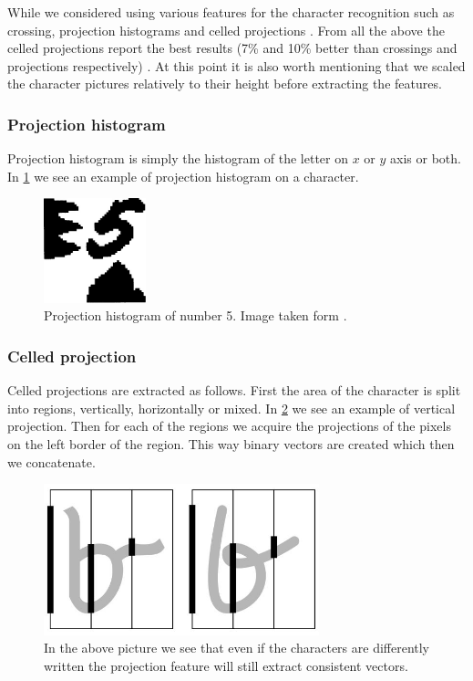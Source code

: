 While we considered using various features for the character recognition such as crossing, projection histograms and celled projections \cite{HWR:features1}\cite{HWR:features2}. From all the above the celled projections report the best results (7\% and 10\% better than crossings and projections respectively) \cite{HWR:features1}. At this point it is also worth mentioning that we scaled the character pictures relatively to their height before extracting the features.


\subsubsection{Projection histogram}
Projection histogram \cite{Chacko2015} is simply the histogram of the letter on $x$ or $y$ axis or both. In \cref{fig:method:features:hist_proj} we see an example of projection histogram on a character.

\begin{figure}[ht]
	\centering
	\includegraphics[width=8em]{shared/img/hist_project.png}
	\caption{Projection histogram of number 5. Image taken form \cite{oliveraugereau}.}
	\label{fig:method:features:hist_proj}
\end{figure}




\subsubsection{Celled projection}
Celled projections are extracted as follows. First the area of the character is split into regions, vertically, horizontally or mixed. In \ref{fig:method:features:feature} we see an example of vertical projection. Then for each of the regions we acquire the projections of the pixels on the left border of the region. This way binary vectors are created which then we concatenate.

\begin{figure}[t!]
	\includegraphics[width=8cm]{shared/img/projection_letter.jpg}
	\caption{In the above picture we see that even if the characters are differently written the projection feature will still extract consistent vectors.}
	\label{fig:method:features:feature}
\end{figure}


